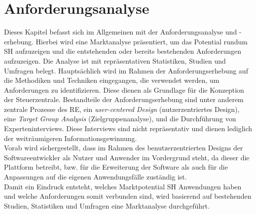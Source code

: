 \chapter{Anforderungsanalyse}
\label{chap:anforderungsanalyse}
    Dieses Kapitel befasst sich im Allgemeinen mit der Anforderungsanalyse und -erhebung. Hierbei wird eine
    Marktanalyse präsentiert, um das Potential rundum \acl{SH} aufzuzeigen und die entstehenden oder bereits 
    bestehenden Anforderungen aufzuzeigen. Die Analyse ist 
    mit repräsentativen Statistiken, Studien und Umfragen belegt. Hauptsächlich wird im Rahmen der Anforderungserhebung 
    auf die Methodiken und Techniken eingegangen, die verwendet werden, um 
    Anforderungen zu identifizieren. Diese dienen als Grundlage für die Konzeption der Steuerzentrale. Bestandteile der 
    Anforderungserhebung sind unter anderem zentrale Prozesse des \acl{RE}, ein \textit{user-centered Design} (nutzerzentriertes Design), 
    eine \textit{Target Group Analysis} (Zielgruppenanalyse), und die Durchführung von 
    Experteninterviews. Diese Interviews sind nicht repräsentativ und dienen lediglich der weiträumigeren Informationsgewinnung. 
    \\
    Vorab wird sichergestellt, dass im Rahmen des benutzerzentrierten Designs der Softwareentwickler als Nutzer und Anwender im 
    Vordergrund steht, da dieser die Plattform betreibt, bzw. für die Erweiterung der Software als auch für die 
    Anpassungen auf die eigenen Anwendungsfälle zuständig ist.
    \\
    \linebreak
    Damit ein Eindruck entsteht, welches Marktpotential \acl{SH} Anwendungen haben und welche Anforderungen somit 
    verbunden sind, wird basierend auf bestehenden Studien, Statistiken und Umfragen eine Marktanalyse durchgeführt.

